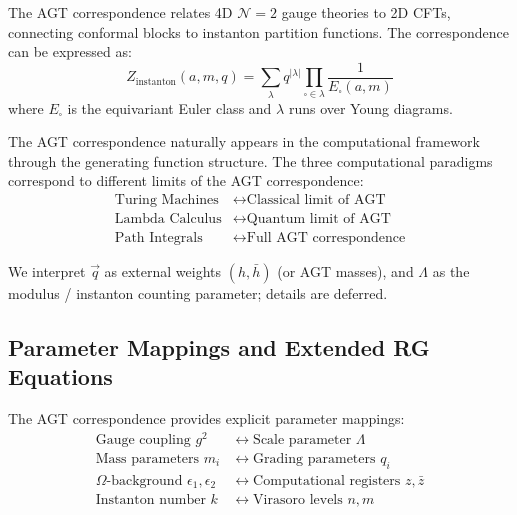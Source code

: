 \begin{definition}
\label{def:agt-correspondence}
The AGT correspondence relates 4D $\mathcal{N}=2$ gauge theories to 2D CFTs, connecting conformal blocks to instanton partition functions. The correspondence can be expressed as:
\[
Z_{\text{instanton}}(a, m, q) = \sum_{\lambda} q^{|\lambda|} \prod_{\square \in \lambda} \frac{1}{E_{\square}(a, m)}
\]
where $E_{\square}$ is the equivariant Euler class and $\lambda$ runs over Young diagrams.
\end{definition}

\begin{theorem}
\label{thm:agt-computational}
The AGT correspondence naturally appears in the computational framework through the generating function structure. The three computational paradigms correspond to different limits of the AGT correspondence:
\begin{align}
\text{Turing Machines} &\leftrightarrow \text{Classical limit of AGT} \\
\text{Lambda Calculus} &\leftrightarrow \text{Quantum limit of AGT} \\
\text{Path Integrals} &\leftrightarrow \text{Full AGT correspondence}
\end{align}

We interpret $\vec{q}$ as external weights $(h,\bar{h})$ (or AGT masses), and $\Lambda$ as the modulus / instanton counting parameter; details are deferred.
\end{theorem}

\subsection{Parameter Mappings and Extended RG Equations}

\begin{definition}
\label{def:agt-parameters}
The AGT correspondence provides explicit parameter mappings:
\begin{align}
\text{Gauge coupling } g^2 &\leftrightarrow \text{Scale parameter } \Lambda \\
\text{Mass parameters } m_i &\leftrightarrow \text{Grading parameters } q_i \\
\text{$\Omega$-background } \epsilon_1, \epsilon_2 &\leftrightarrow \text{Computational registers } z, \bar{z} \\
\text{Instanton number } k &\leftrightarrow \text{Virasoro levels } n, m
\end{align}
\end{definition}

